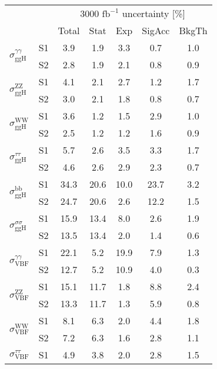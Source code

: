 \begin{tabular}{@{} l c c@{\hskip 0.15in} c c c c @{}}
 \hline
  &  & \multicolumn{5}{c}{3000 $\text{fb}^{-1}$ uncertainty [\%]} \\
  &  & Total & Stat & Exp & SigAcc & BkgTh \\
 \hline
\multirow{2}{*}{$\sigma_{\mathrm{ggH}}^{\gamma \gamma }$} & S1  & 3.9& 1.9 & 3.3 & 0.7 & 1.0  \\[1pt]
                        & S2  & 2.8& 1.9 & 2.1 & 0.8 & 0.9  \\[4pt]
\multirow{2}{*}{$\sigma_{\mathrm{ggH}}^{\mathrm{ZZ}}$} & S1  & 4.1& 2.1 & 2.7 & 1.2 & 1.7  \\[1pt]
                        & S2  & 3.0& 2.1 & 1.8 & 0.8 & 0.7  \\[4pt]
\multirow{2}{*}{$\sigma_{\mathrm{ggH}}^{\mathrm{WW}}$} & S1  & 3.6& 1.2 & 1.5 & 2.9 & 1.0  \\[1pt]
                        & S2  & 2.5& 1.2 & 1.2 & 1.6 & 0.9  \\[4pt]
\multirow{2}{*}{$\sigma_{\mathrm{ggH}}^{\tau \tau }$} & S1  & 5.7& 2.6 & 3.5 & 3.3 & 1.7  \\[1pt]
                        & S2  & 4.6& 2.6 & 2.9 & 2.3 & 0.7  \\[4pt]
\multirow{2}{*}{$\sigma_{\mathrm{ggH}}^{\mathrm{bb}}$} & S1  & 34.3& 20.6 & 10.0 & 23.7 & 3.2  \\[1pt]
                        & S2  & 24.7& 20.6 & 2.6 & 12.2 & 1.5  \\[4pt]
\multirow{2}{*}{$\sigma_{\mathrm{ggH}}^{\sigma \sigma }$} & S1  & 15.9& 13.4 & 8.0 & 2.6 & 1.9  \\[1pt]
                        & S2  & 13.5& 13.4 & 2.0 & 1.4 & 0.6  \\[4pt]
\multirow{2}{*}{$\sigma_{\mathrm{VBF}}^{\gamma \gamma }$} & S1  & 22.1& 5.2 & 19.9 & 7.9 & 1.3  \\[1pt]
                        & S2  & 12.7& 5.2 & 10.9 & 4.0 & 0.3  \\[4pt]
\multirow{2}{*}{$\sigma_{\mathrm{VBF}}^{\mathrm{ZZ}}$} & S1  & 15.1& 11.7 & 1.8 & 8.8 & 2.4  \\[1pt]
                        & S2  & 13.3& 11.7 & 1.3 & 5.9 & 0.8  \\[4pt]
\multirow{2}{*}{$\sigma_{\mathrm{VBF}}^{\mathrm{WW}}$} & S1  & 8.1& 6.3 & 2.0 & 4.4 & 1.8  \\[1pt]
                        & S2  & 7.2& 6.3 & 1.6 & 2.8 & 1.1  \\[4pt]
\multirow{2}{*}{$\sigma_{\mathrm{VBF}}^{\tau \tau }$} & S1  & 4.9& 3.8 & 2.0 & 2.8 & 1.5  \\[1pt]

\end{tabular}
